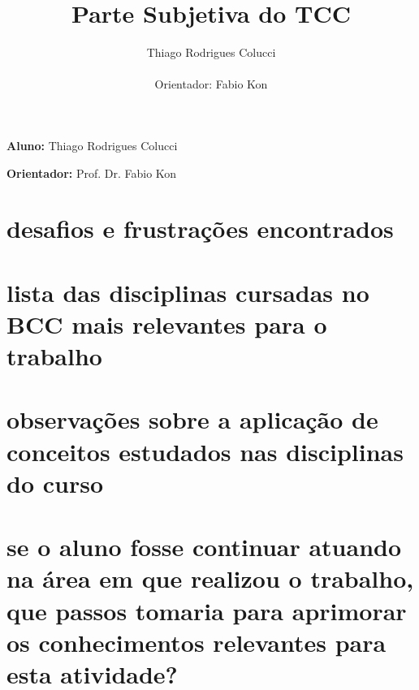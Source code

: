 \documentclass[11pt,a4paper]{article}
\title{Parte Subjetiva do TCC}
\author{Thiago Rodrigues Colucci\\\\Orientador: Fabio Kon}
\begin{document}
\maketitle

\newpage

\tableofcontents
\newpage
\textbf{Aluno:} Thiago Rodrigues Colucci

\textbf{Orientador:} Prof. Dr. Fabio Kon

\section{ desafios e frustrações encontrados}


\section{lista das disciplinas cursadas no BCC mais relevantes para o trabalho}


\section{observações sobre a aplicação de conceitos estudados nas disciplinas do curso}


\section{se o aluno fosse continuar atuando na área em que realizou o trabalho, que passos tomaria para aprimorar os conhecimentos relevantes para esta atividade?}
\end{document}
